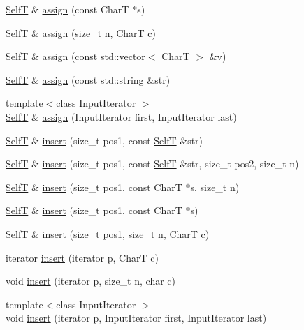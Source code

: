 \begin{CompactItemize}
\hyperlink{classdeque__string}{SelfT} \& \hyperlink{classdeque__string_6011b5371797b1a7ce8e0f98de3892e2}{assign} (const CharT $\ast$s)
\item 
\hyperlink{classdeque__string}{SelfT} \& \hyperlink{classdeque__string_131a536647ad8f6ad580addff43c6fc4}{assign} (size\_\-t n, CharT c)
\item 
\hyperlink{classdeque__string}{SelfT} \& \hyperlink{classdeque__string_66230e3dcfe245f877558ffe0fce711a}{assign} (const std::vector$<$ CharT $>$ \&v)
\item 
\hyperlink{classdeque__string}{SelfT} \& \hyperlink{classdeque__string_70d8b09a7c215edb6cf46bb75c6a0302}{assign} (const std::string \&str)
\item 
{\footnotesize template$<$class InputIterator $>$ }\\\hyperlink{classdeque__string}{SelfT} \& \hyperlink{classdeque__string_c5b8af527d69203338e2450164dbdd8c}{assign} (InputIterator first, InputIterator last)
\item 
\hyperlink{classdeque__string}{SelfT} \& \hyperlink{classdeque__string_9a83bbe40adafff72391797edcce5b31}{insert} (size\_\-t pos1, const \hyperlink{classdeque__string}{SelfT} \&str)
\item 
\hyperlink{classdeque__string}{SelfT} \& \hyperlink{classdeque__string_c273e9d441667b1ff923864a61ad5be1}{insert} (size\_\-t pos1, const \hyperlink{classdeque__string}{SelfT} \&str, size\_\-t pos2, size\_\-t n)
\item 
\hyperlink{classdeque__string}{SelfT} \& \hyperlink{classdeque__string_c547df6a384f56123d3d1a7699ca3d79}{insert} (size\_\-t pos1, const CharT $\ast$s, size\_\-t n)
\item 
\hyperlink{classdeque__string}{SelfT} \& \hyperlink{classdeque__string_2b8514eee08029ac4330f119595618b9}{insert} (size\_\-t pos1, const CharT $\ast$s)
\item 
\hyperlink{classdeque__string}{SelfT} \& \hyperlink{classdeque__string_f6733b1f605197c2d81b2c5422726b9c}{insert} (size\_\-t pos1, size\_\-t n, CharT c)
\item 
iterator \hyperlink{classdeque__string_78045a454b744aec347592e03d1c9afc}{insert} (iterator p, CharT c)
\item 
void \hyperlink{classdeque__string_8cac88fe8224395a9df71f1d95c90d4d}{insert} (iterator p, size\_\-t n, char c)
\item 
{\footnotesize template$<$class InputIterator $>$ }\\void \hyperlink{classdeque__string_6aba1bf950849ebc4333fc68398e1c57}{insert} (iterator p, InputIterator first, InputIterator last)

\end{CompactItemize}
